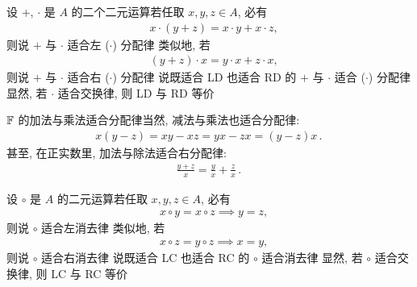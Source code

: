 \begin{definition}
    设 $+$, $\cdot$ 是 $A$ 的二个二元运算\period 若任取 $x,y,z \in A$, 必有
    \begin{align*}
         & x \cdot (y + z) = x \cdot y + x \cdot z, \tag*{(LD)}
    \end{align*}
    则说 $+$ 与 $\cdot$ 适合左 ($\cdot$) 分配律 \period 类似地, 若
    \begin{align*}
         & (y + z) \cdot x = y \cdot x + z \cdot x, \tag*{(RD)}
    \end{align*}
    则说 $+$ 与 $\cdot$ 适合右 ($\cdot$) 分配律 \period 说既适合 LD 也适合 RD 的 $+$ 与 $\cdot$ 适合 ($\cdot$) 分配律 \period 显然, 若 $\cdot$ 适合交换律, 则 LD 与 RD 等价\period
\end{definition}

\begin{example}
    $\mathbb{F}$ 的加法与乘法适合分配律\period 当然, 减法与乘法也适合分配律:
    \begin{align*}
        x(y-z) = xy - xz = yx - zx = (y-z)x \period
    \end{align*}
    甚至, 在正实数里, 加法与除法适合右分配律:
    \begin{align*}
        \frac{y+z}{x} = \frac{y}{x} + \frac{z}{x} \period
    \end{align*}
\end{example}

\begin{definition}
    设 $\circ$ 是 $A$ 的二元运算\period 若任取 $x,y,z \in A$, 必有
    \begin{align*}
         & x \circ y = x \circ z \implies y = z, \tag*{(LC)}
    \end{align*}
    则说 $\circ$ 适合左消去律 \period 类似地, 若
    \begin{align*}
         & x \circ z = y \circ z \implies x = y, \tag*{(RC)}
    \end{align*}
    则说 $\circ$ 适合右消去律 \period 说既适合 LC 也适合 RC 的 $\circ$ 适合消去律 \period 显然, 若 $\circ$ 适合交换律, 则 LC 与 RC 等价\period
\end{definition}

